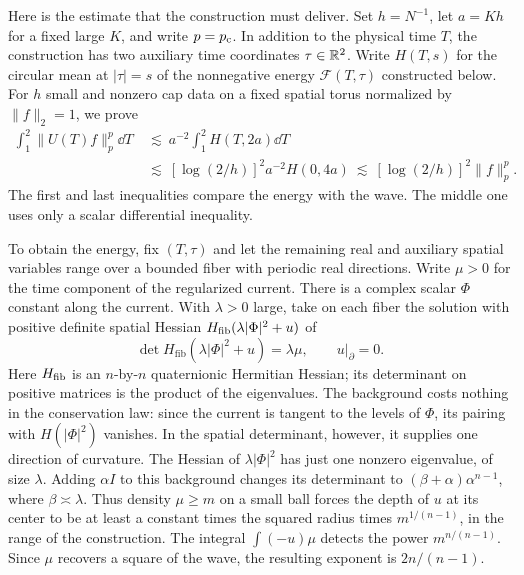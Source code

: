 Here is the estimate that the construction must deliver. Set $h=N^{-1}$,
let $a=Kh$ for a fixed large $K$, and write $p=p_{\mathrm c}$. In addition to the
physical time $T$, the construction has two auxiliary time coordinates
$\tau\in\mathbb R^2$. Write $H(T,s)$ for the circular mean at $|\tau|=s$
of the nonnegative energy $\mathcal F(T,\tau)$ constructed below. For $h$ small and nonzero
cap data on a fixed spatial torus normalized by $\|f\|_2=1$, we prove
\begin{align*}
 \int_1^2\|U(T)f\|_p^p\dd T
 &\ \lesssim\ a^{-2}\!\int_1^2 H(T,2a)\dd T\\
 &\ \lesssim\ [\log(2/h)]^2 a^{-2} H(0,4a)
 \ \lesssim\ [\log(2/h)]^2\|f\|_p^p .
\end{align*}
The first and last inequalities compare the energy with the wave. The
middle one uses only a scalar differential inequality.

To obtain the energy, fix $(T,\tau)$ and let the remaining real and
auxiliary spatial variables range over a bounded fiber with periodic
real directions. Write $\mu>0$ for the time component of the regularized
current. There is a complex scalar $\Phi$ constant along the current.
With $\lambda>0$ large, take on each fiber the solution with positive
definite spatial Hessian $H_{\rm fib}(\lambda|\Phi|^2+u)$ of
\[
   \det H_{\mathrm{fib}}(\lambda|\Phi|^2+u)=\lambda\mu,
   \qquad u|_{\partial}=0 .
\]
Here $H_{\rm fib}$ is an $n$-by-$n$ quaternionic Hermitian Hessian; its
determinant on positive matrices is the product of the eigenvalues.
The background costs nothing in the conservation law: since the
current is tangent to the levels of $\Phi$, its pairing with
$H(|\Phi|^2)$ vanishes. In the spatial determinant, however, it
supplies one direction of curvature. The Hessian of $\lambda|\Phi|^2$ has just one nonzero eigenvalue,
of size $\lambda$. Adding $\alpha I$ to this background changes its
determinant to $(\beta+\alpha)\alpha^{n-1}$, where $\beta\asymp\lambda$.
Thus density $\mu\ge m$ on a small ball forces the depth of $u$ at
its center to be at least a constant times the squared radius times
$m^{1/(n-1)}$, in the range of the construction. The integral
$\int(-u)\mu$ detects the power $m^{n/(n-1)}$. Since $\mu$ recovers
a square of the wave, the resulting exponent is $2n/(n-1)$.

